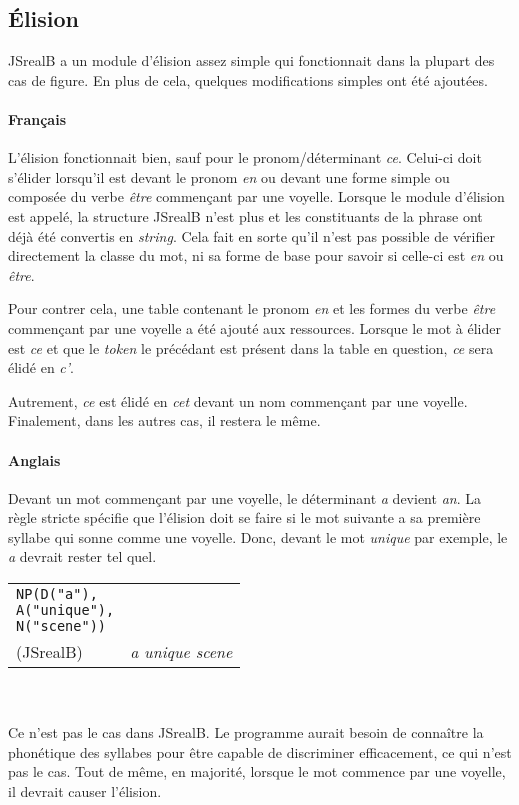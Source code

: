 \documentclass[11pt]{article} %
\newcommand{\real}[1]{\emph{#1}}
\begin{document}
\subsection{Élision}

JSrealB a un module d'élision assez simple qui fonctionnait dans la plupart des cas de figure.
En plus de cela, quelques modifications simples ont été ajoutées.
\paragraph{Français}
L'élision fonctionnait bien, sauf pour le pronom/déterminant \emph{ce}. Celui-ci doit
s'élider lorsqu'il est devant le pronom \emph{en} ou devant une forme simple ou composée
du verbe \emph{être} commençant par une voyelle. Lorsque le module d'élision est appelé, la structure JSrealB n'est plus 
et les constituants de la phrase ont déjà été convertis en \emph{string}. Cela fait en sorte
qu'il n'est pas possible de vérifier directement la classe du mot, ni sa forme de base pour savoir
si celle-ci est \emph{en} ou \emph{être}. 

Pour contrer cela, une table contenant le pronom \emph{en}
et les formes du verbe \emph{être} commençant par une voyelle a été ajouté aux ressources.
Lorsque le mot à élider est \emph{ce} et que le \emph{token} le précédant est présent
dans la table en question, \emph{ce} sera élidé en \emph{c'}. 

Autrement, \emph{ce} est
élidé en \emph{cet} devant un nom commençant par une voyelle. Finalement, dans les autres cas, 
il restera le même.

\paragraph{Anglais}
Devant un mot commençant par une voyelle, le déterminant \emph{a} devient \emph{an}.
La règle stricte spécifie que l'élision doit se faire si le mot suivante a sa première
syllabe qui sonne comme une voyelle. Donc, devant le mot \emph{unique} par exemple,
le \emph{a} devrait rester tel quel. \\
\begin{tabular}{p{4.5cm} p{8cm}}
\begin{alltt}
NP(D("a"),
   A("unique"),
   N("scene"))
\end{alltt} &
\begin{alltt}
\end{alltt} \\
\real{\color{red}{an unique scene}} (JSrealB) & \real{\color{green}a unique scene}
\end{tabular}
\\
\\
Ce n'est pas le cas dans JSrealB. Le programme aurait 
besoin de connaître la phonétique des syllabes pour être capable de discriminer
efficacement, ce qui n'est pas le cas. Tout de même, en majorité, lorsque le mot commence
par une voyelle, il devrait causer l'élision.
\end{document}
